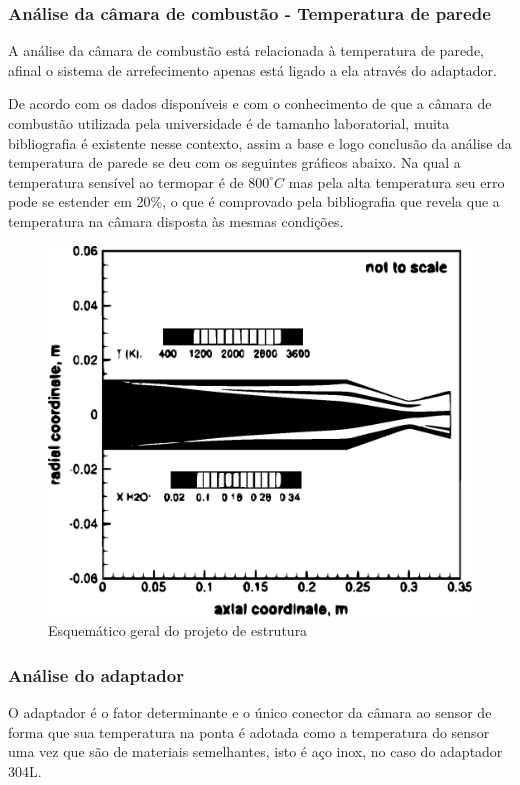 \subsubsection{Análise da câmara de combustão - Temperatura de parede}

A análise da câmara de combustão está relacionada à temperatura de parede, afinal o sistema de arrefecimento apenas está ligado a ela através do adaptador. 

De acordo com os dados disponíveis e com o conhecimento de que a câmara de combustão utilizada pela universidade é de tamanho laboratorial, muita bibliografia é existente nesse contexto, assim a base e logo conclusão da análise da temperatura de parede se deu com os seguintes gráficos abaixo. Na qual a temperatura sensível ao termopar é de $800^{\circ}C$ mas pela alta temperatura seu erro pode se estender em 20\%, o que é comprovado pela bibliografia que revela que a temperatura na câmara disposta às mesmas condições.

\begin{figure}[!htb]                                                               
   \centering                                                                      
   \includegraphics[keepaspectratio=true]{figuras/Camara1.eps}
   \caption{Esquemático geral do projeto de estrutura}                        
\end{figure}

\subsubsection{Análise do adaptador}
O adaptador é o fator determinante e o único conector da câmara ao sensor de forma que sua temperatura na ponta é adotada como a temperatura do sensor uma vez que são de materiais semelhantes, isto é aço inox, no caso do adaptador 304L.

